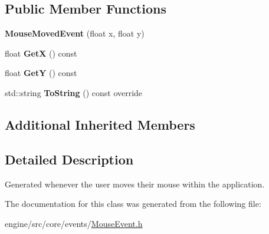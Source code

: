 \subsection*{Public Member Functions}
\begin{DoxyCompactItemize}
\item 
\mbox{\label{classengine_1_1events_1_1MouseMovedEvent_a970a64e27a0d4dc882e07d18e31c9e88}} 
{\bfseries Mouse\+Moved\+Event} (float x, float y)
\item 
\mbox{\label{classengine_1_1events_1_1MouseMovedEvent_a6d8a932ee6d337f3d18fafb12805c4c4}} 
float {\bfseries GetX} () const
\item 
\mbox{\label{classengine_1_1events_1_1MouseMovedEvent_a6f0d99a80de44d2bdd45d319bdfaa3f4}} 
float {\bfseries GetY} () const
\item 
\mbox{\label{classengine_1_1events_1_1MouseMovedEvent_a9e8339925959fd0226b7c4cd1aa12fd3}} 
std\+::string {\bfseries To\+String} () const override
\end{DoxyCompactItemize}
\subsection*{Additional Inherited Members}


\subsection{Detailed Description}
Generated whenever the user moves their mouse within the application. 

The documentation for this class was generated from the following file\+:\begin{DoxyCompactItemize}
\item 
engine/src/core/events/\hyperlink{MouseEvent_8h}{Mouse\+Event.\+h}\end{DoxyCompactItemize}
